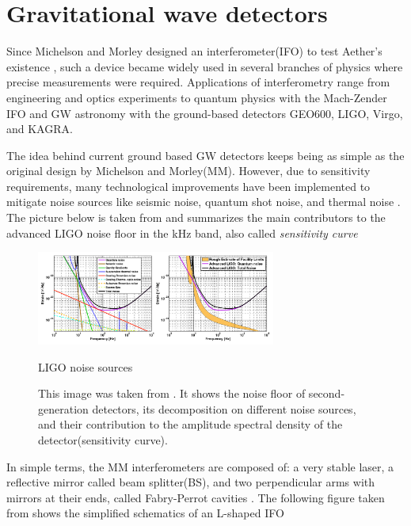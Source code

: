 \section{Gravitational wave detectors}

Since Michelson and Morley designed an interferometer(IFO) to test Aether's existence \cite{Michelson333}, such a device became widely used in several branches of physics where precise measurements were required. Applications of interferometry range from engineering and optics experiments to quantum physics with the Mach-Zender IFO and GW astronomy with the ground-based detectors GEO600, LIGO, Virgo, and KAGRA.

The idea behind current ground based GW detectors keeps being as simple as the original design by Michelson and Morley(MM). However, due to sensitivity requirements, many technological improvements have been implemented to mitigate noise sources like seismic noise, quantum shot noise, and thermal noise \cite{LIGOScientific:2013pcc}. The picture below is taken from \cite{Hild_2012} and summarizes the main contributors to the advanced LIGO noise floor in the kHz band, also called \textit{sensitivity curve}  


\begin{figure}[hbt!]
\begin{center}
\includegraphics[width=0.7\textwidth, angle=0]{images/aligo.png}
\captionsetup{width=0.8\textwidth}
\caption{LIGO noise sources}
\caption*{This image was taken from \cite{Hild_2012}. It shows the noise floor of second-generation detectors, its decomposition on different noise sources, and their contribution to the amplitude spectral density of the detector(sensitivity curve).}
\label{LIGO}
\end{center}
\end{figure}
\FloatBarrier

In simple terms, the MM interferometers are composed of: a very stable laser, a reflective mirror called beam splitter(BS), and two perpendicular arms with mirrors at their ends, called Fabry-Perrot cavities \cite{Saulson:1995zi}. The following figure taken from \cite{Hild_2012} shows the simplified schematics of an L-shaped IFO   


